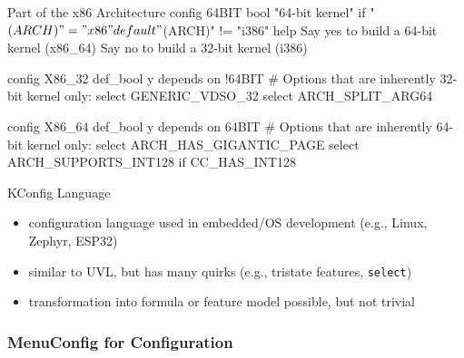 \begin{frame}[fragile]{\myframetitle}
	\begin{mycolumns}
		\begin{kconfigtight}[basicstyle=\small]{Part of the x86 Architecture }
config 64BIT
	bool "64-bit kernel" if "$(ARCH)" = "x86"
	default "$(ARCH)" != "i386"
	help
		Say yes to build a 64-bit kernel (x86_64)
		Say no to build a 32-bit kernel (i386)

config X86_32
	def_bool y
	depends on !64BIT
	# Options that are inherently 32-bit kernel only:
	select GENERIC_VDSO_32
	select ARCH_SPLIT_ARG64

config X86_64
	def_bool y
	depends on 64BIT
	# Options that are inherently 64-bit kernel only:
	select ARCH_HAS_GIGANTIC_PAGE
	select ARCH_SUPPORTS_INT128 if CC_HAS_INT128
\end{kconfigtight}
	\mynextcolumn
		\begin{definition}{KConfig Language}
			\begin{itemize}
				\item configuration language used in embedded/OS development (e.g., Linux, Zephyr, ESP32)
				\item similar to UVL, but has many quirks (e.g., tristate features, \texttt{select})
				\item transformation into formula or feature model possible, but not trivial 
			\end{itemize}
		\end{definition}
		\hspace*{-0.07253886\linewidth}%
	\end{mycolumns}
\end{frame}

\subsubsection*{MenuConfig for Configuration}

